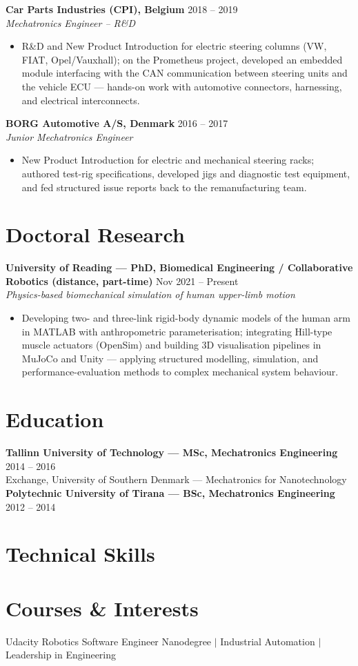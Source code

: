 \noindent\textbf{Car Parts Industries (CPI), Belgium} \hfill 2018 -- 2019\\
\textit{Mechatronics Engineer -- R\&D}
\begin{itemize}
  \item R\&D and New Product Introduction for electric steering columns (VW, FIAT, Opel/Vauxhall); on the Prometheus project, developed an embedded module interfacing with the CAN communication between steering units and the vehicle ECU --- hands-on work with automotive connectors, harnessing, and electrical interconnects.
\end{itemize}

\noindent\textbf{BORG Automotive A/S, Denmark} \hfill 2016 -- 2017\\
\textit{Junior Mechatronics Engineer}
\begin{itemize}
  \item New Product Introduction for electric and mechanical steering racks; authored test-rig specifications, developed jigs and diagnostic test equipment, and fed structured issue reports back to the remanufacturing team.
\end{itemize}

\section*{Doctoral Research}
\noindent\textbf{University of Reading --- PhD, Biomedical Engineering / Collaborative Robotics (distance, part-time)} \hfill Nov 2021 -- Present\\
\textit{Physics-based biomechanical simulation of human upper-limb motion}
\begin{itemize}
  \item Developing two- and three-link rigid-body dynamic models of the human arm in MATLAB with anthropometric parameterisation; integrating Hill-type muscle actuators (OpenSim) and building 3D visualisation pipelines in MuJoCo and Unity --- applying structured modelling, simulation, and performance-evaluation methods to complex mechanical system behaviour.
\end{itemize}

\section*{Education}
\noindent\textbf{Tallinn University of Technology --- MSc, Mechatronics Engineering} \hfill 2014 -- 2016\\
Exchange, University of Southern Denmark --- Mechatronics for Nanotechnology\EducationExtra\\
\textbf{Polytechnic University of Tirana --- BSc, Mechatronics Engineering} \hfill 2012 -- 2014

\section*{Technical Skills}
\Skills

\section*{Courses \& Interests}
Udacity Robotics Software Engineer Nanodegree \; $|$ \; Industrial Automation \; $|$ \; Leadership in Engineering\\
\Interests
